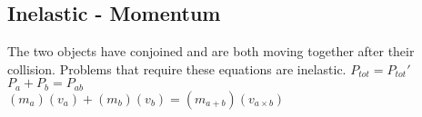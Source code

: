 \begin{adjustwidth}{1cm}{0pt}
    \subsection{Inelastic - Momentum}
    \begin{flushleft}
        The two objects have conjoined and are both moving together after their collision. Problems that require these equations are inelastic.\newline\newline
        $P_{tot} = P_{tot}\prime$ \\
        \vspace*{10pt}
        $P_{a} + P_{b} = P_{ab}$ \\
        \vspace*{10pt}
        $(m_{a})(v_{a}) + (m_{b})(v_{b}) = (m_{a + b})(v_{a\times b})$
    \end{flushleft}
\end{adjustwidth}